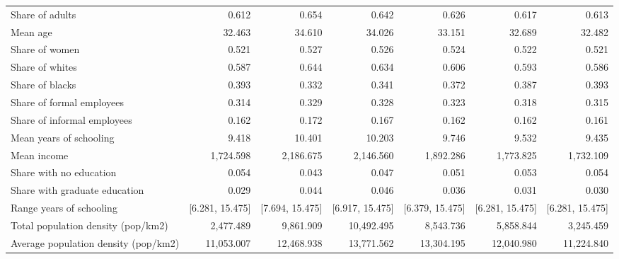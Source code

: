 \begin{tabular}{lrrrrrr}
    Share of adults & 0.612 & 0.654 & 0.642 & 0.626 & 0.617 & 0.613 \\
    Mean age & 32.463 & 34.610 & 34.026 & 33.151 & 32.689 & 32.482 \\
    Share of women & 0.521 & 0.527 & 0.526 & 0.524 & 0.522 & 0.521 \\
    Share of whites & 0.587 & 0.644 & 0.634 & 0.606 & 0.593 & 0.586 \\
    Share of blacks & 0.393 & 0.332 & 0.341 & 0.372 & 0.387 & 0.393 \\
    Share of formal employees & 0.314 & 0.329 & 0.328 & 0.323 & 0.318 & 0.315 \\
    Share of informal employees & 0.162 & 0.172 & 0.167 & 0.162 & 0.162 & 0.161 \\
    Mean years of schooling & 9.418 & 10.401 & 10.203 & 9.746 & 9.532 & 9.435 \\
    Mean income & 1,724.598 & 2,186.675 & 2,146.560 & 1,892.286 & 1,773.825 & 1,732.109 \\
    Share with no education & 0.054 & 0.043 & 0.047 & 0.051 & 0.053 & 0.054 \\
    Share with graduate education & 0.029 & 0.044 & 0.046 & 0.036 & 0.031 & 0.030 \\
    Range years of schooling & [6.281, 15.475] & [7.694, 15.475] & [6.917, 15.475] & [6.379, 15.475] & [6.281, 15.475] & [6.281, 15.475] \\
    Total population density (pop/km2) & 2,477.489 & 9,861.909 & 10,492.495 & 8,543.736 & 5,858.844 & 3,245.459 \\
    Average population density (pop/km2) & 11,053.007 & 12,468.938 & 13,771.562 & 13,304.195 & 12,040.980 & 11,224.840 \\
    \bottomrule
    \bottomrule
\end{tabular}
